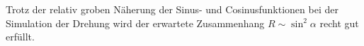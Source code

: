 \documentclass[german,  %
parskip=full,  %
]{scrartcl}
\begin{document}
Trotz der relativ groben Näherung der Sinus- und Cosinusfunktionen bei der Simulation der Drehung wird der erwartete Zusammenhang \(R\sim\sin^2\alpha\) recht gut erfüllt.
%
\end{document}
